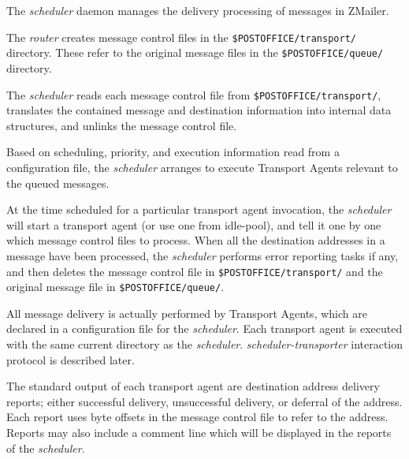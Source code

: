 
The {\em scheduler\/} daemon manages the delivery processing of 
messages in ZMailer.

The {\em router\/} creates message control files in the
{\tt \$POSTOFFICE/transport/} directory. These refer to 
the original message files in the {\tt \$POSTOFFICE/queue/} 
directory.

The {\em scheduler\/} reads each message control file from
{\tt \$POSTOFFICE/transport/}, translates the contained 
message and destination information into internal data structures, 
and unlinks the message control file.

Based on scheduling, priority, and execution information read from a
configuration file, the {\em scheduler\/} arranges to execute 
Transport Agents relevant to the queued messages.

At the time scheduled for a particular transport agent invocation, the
{\em scheduler\/} will start a transport agent (or use one from idle-pool),
and tell it one by one which message control files to process.
When all the destination addresses in a message have been processed, the
{\em scheduler\/} performs error reporting tasks if any, and then deletes the
message control file in {\tt \$POSTOFFICE/transport/} and 
the original message file in {\tt \$POSTOFFICE/queue/}.

All message delivery is actually performed by Transport Agents, which
are declared in a configuration file for the {\em scheduler\/}.
Each transport agent is executed with the same current directory as the
{\em scheduler\/}. {\em scheduler-transporter\/} interaction protocol is
described later.

The standard output of each transport agent are destination address
delivery reports; either successful delivery, unsuccessful delivery, or
deferral of the address. Each report uses byte offsets in the message
control file to refer to the address. Reports may also include a comment
line which will be displayed in the reports of the {\em scheduler\/}.

